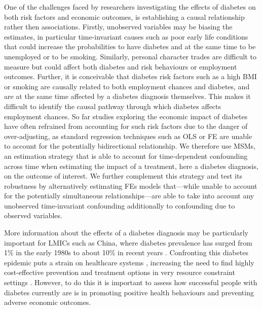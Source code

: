 One of the challenges faced by researchers investigating the effects of diabetes on both risk factors and economic outcomes, is establishing a causal relationship rather then associations. Firstly, unobserved variables may be biasing the estimates, in particular time-invariant causes such as poor early life conditions that could increase the probabilities to have diabetes and at the same time to be unemployed or to be smoking. Similarly, personal character trades are difficult to measure but could affect both diabetes and risk behaviours or employment outcomes. Further, it is conceivable that diabetes risk factors such as a high \ac{BMI} or smoking are causally related to both employment chances and diabetes, and are at the same time affected by a diabetes diagnosis themselves. This makes it difficult to identify the causal pathway through which diabetes affects employment chances. So far studies exploring the economic impact of diabetes have often refrained from accounting for such risk factors due to the danger of over-adjusting, as standard regression techniques such as \ac{OLS} or \ac{FE} are unable to account for the potentially bidirectional relationship. We therefore use \acp{MSM}, an estimation strategy that is able to account for time-dependent confounding across time \parencite{Robins2000} when estimating the impact of a treatment, here a diabetes diagnosis, on the outcome of interest. We further complement this strategy and test its robustness by alternatively estimating \acp{FE} models that---while unable to account for the potentially simultaneous relationships---are able to take into account any unobserved time-invariant confounding additionally to confounding due to observed variables.

More information about the effects of a diabetes diagnosis may be particularly important for \acp{LMIC} such as China, where diabetes prevalence has surged from 1\% in the early 1980s to about 10\% in recent years \autocite{Hu2011,Risk2016}. Confronting this diabetes epidemic puts a strain on healthcare systems \parencite{Seuring2015a}, increasing the need to find highly cost-effective prevention and treatment options in very resource constraint settings \parencite{WHOresearchpriorities2010}. However, to do this it is important to assess how successful people with diabetes currently are is in promoting positive health behaviours and preventing adverse economic outcomes.

